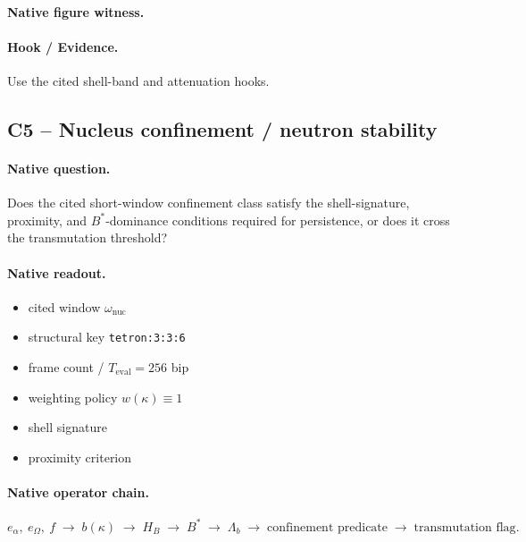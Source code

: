 \paragraph{Native figure witness.}
\begin{center}
\end{center}
\paragraph{Hook / Evidence.} Use the cited shell-band and attenuation hooks.


\subsection{C5 -- Nucleus confinement / neutron stability}\label{app:c5}
\paragraph{Native question.} Does the cited short-window confinement class satisfy the shell-signature, proximity, and $B^*$-dominance conditions required for persistence, or does it cross the transmutation threshold?
\paragraph{Native readout.}
\begin{itemize}
\item cited window $\omega_{\mathrm{nuc}}$
\item structural key \texttt{tetron:3:3:6}
\item frame count / $T_{\mathrm{eval}}=256$ bip
\item weighting policy $w(\kappa)\equiv 1$
\item shell signature
\item proximity criterion
\end{itemize}
\paragraph{Native operator chain.}
\[
e_\alpha,\ e_\Omega,\ f
\;\to\;
b(\kappa)
\;\to\;
H_B
\;\to\;
B^*
\;\to\;
\Lambda_b
\;\to\;
\text{confinement predicate}
\;\to\;
\text{transmutation flag}.
\]
